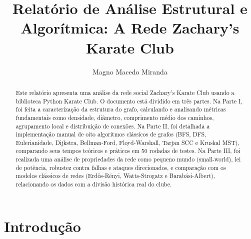\documentclass[sigconf,nonacm]{webmedia}
\begin{document}
\title{Relatório de Análise Estrutural e Algorítmica: A Rede Zachary's Karate Club}

\author{Magno Macedo Miranda}

\renewcommand{\shortauthors}{Macedo}

\begin{abstract}
  Este relatório apresenta uma análise da rede social {Zachary's Karate Club} usando a biblioteca Python {Karate Club}. O documento está dividido em três partes. Na Parte I, foi feita a caracterização da estrutura do grafo, calculando e analisando métricas fundamentais como densidade, diâmetro, comprimento médio dos caminhos, agrupamento local e distribuição de conexões. Na Parte II, foi detalhada a implementação manual de oito algoritmos clássicos de grafos (BFS, DFS, Eulerianidade, Dijkstra, Bellman-Ford, Floyd-Warshall, Tarjan SCC e Kruskal MST), comparando seus tempos teóricos e práticos em 50 rodadas de testes. Na Parte III, foi realizada uma análise de propriedades da rede como pequeno mundo ({small-world}), lei de potência, robustez contra falhas e ataques direcionados, e comparação com os modelos clássicos de redes (Erdős-Rényi, Watts-Strogatz e Barabási-Albert), relacionando os dados com a divisão histórica real do clube.
\end{abstract}


\maketitle

\section{Introdução}
\end{document}
